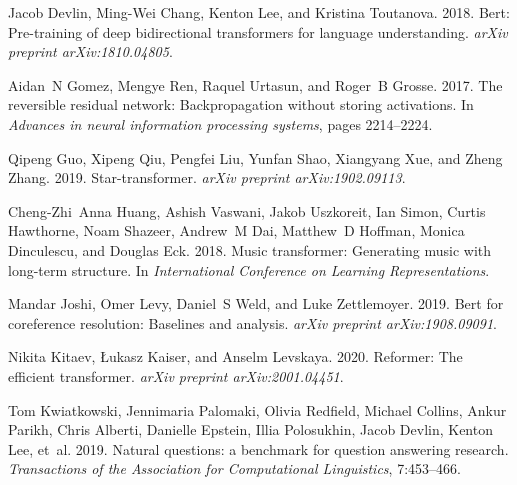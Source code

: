 \documentclass[11pt,a4paper]{article}
\begin{document}
\begin{thebibliography}{44}
Jacob Devlin, Ming-Wei Chang, Kenton Lee, and Kristina Toutanova. 2018.
\newblock Bert: Pre-training of deep bidirectional transformers for language
  understanding.
\newblock \emph{arXiv preprint arXiv:1810.04805}.

Aidan~N Gomez, Mengye Ren, Raquel Urtasun, and Roger~B Grosse. 2017.
\newblock The reversible residual network: Backpropagation without storing
  activations.
\newblock In \emph{Advances in neural information processing systems}, pages
  2214--2224.

Qipeng Guo, Xipeng Qiu, Pengfei Liu, Yunfan Shao, Xiangyang Xue, and Zheng
  Zhang. 2019.
\newblock Star-transformer.
\newblock \emph{arXiv preprint arXiv:1902.09113}.

Cheng-Zhi~Anna Huang, Ashish Vaswani, Jakob Uszkoreit, Ian Simon, Curtis
  Hawthorne, Noam Shazeer, Andrew~M Dai, Matthew~D Hoffman, Monica Dinculescu,
  and Douglas Eck. 2018.
\newblock Music transformer: Generating music with long-term structure.
\newblock In \emph{International Conference on Learning Representations}.

Mandar Joshi, Omer Levy, Daniel~S Weld, and Luke Zettlemoyer. 2019.
\newblock Bert for coreference resolution: Baselines and analysis.
\newblock \emph{arXiv preprint arXiv:1908.09091}.

Nikita Kitaev, {\L}ukasz Kaiser, and Anselm Levskaya. 2020.
\newblock Reformer: The efficient transformer.
\newblock \emph{arXiv preprint arXiv:2001.04451}.

Tom Kwiatkowski, Jennimaria Palomaki, Olivia Redfield, Michael Collins, Ankur
  Parikh, Chris Alberti, Danielle Epstein, Illia Polosukhin, Jacob Devlin,
  Kenton Lee, et~al. 2019.
\newblock Natural questions: a benchmark for question answering research.
\newblock \emph{Transactions of the Association for Computational Linguistics},
  7:453--466.


\end{thebibliography}
\end{document}
